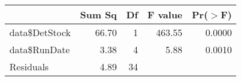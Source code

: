 \begin{table}[ht]
\centering
\begin{tabular}{lrrrr}
  \hline
 & Sum Sq & Df & F value & Pr($>$F) \\ 
  \hline
data\$DetStock & 66.70 & 1 & 463.55 & 0.0000 \\ 
  data\$RunDate & 3.38 & 4 & 5.88 & 0.0010 \\ 
  Residuals & 4.89 & 34 &  &  \\ 
   \hline
\end{tabular}
\end{table}
